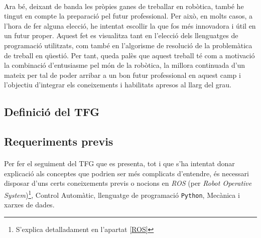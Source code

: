 \documentclass[12pt,a4paper,final,twoside]{article}
\begin{document}
\paragraph{}Ara bé, deixant de banda les pròpies ganes de treballar en robòtica, també he tingut en compte la preparació pel futur professional. Per això, en molts casos, a l'hora de fer alguna elecció, he intentat escollir la que fos més innovadora i útil en un futur proper. Aquest fet es visualitza tant en l'elecció dels llenguatges de programació utilitzats, com també en l'algorisme de resolució de la problemàtica de treball en qüestió. Per tant, queda palès que aquest treball té com a motivació la combinació d'entusiasme pel món de la robòtica, la millora continuada d'un mateix per tal de poder arribar a un bon futur professional en aquest camp i l'objectiu d'integrar els coneixements i habilitats apresos al llarg del grau.

\label{Definicio-del-TFG}
\subsection*{Definició del TFG}

\label{Requeriments}
\subsection*{Requeriments previs}

\paragraph{}Per fer el seguiment del TFG que es presenta, tot i que s'ha intentat donar explicació als conceptes que podrien ser més complicats d'entendre, és necessari disposar d'uns certs coneixements previs o nocions en \textit{ROS} (per \textit{Robot Operative System})\footnote{S'explica detalladament en l'apartat \ref{ROS}}, Control Automàtic, llenguatge de programació \texttt{Python}, Mecànica i xarxes de dades.
\end{document}

